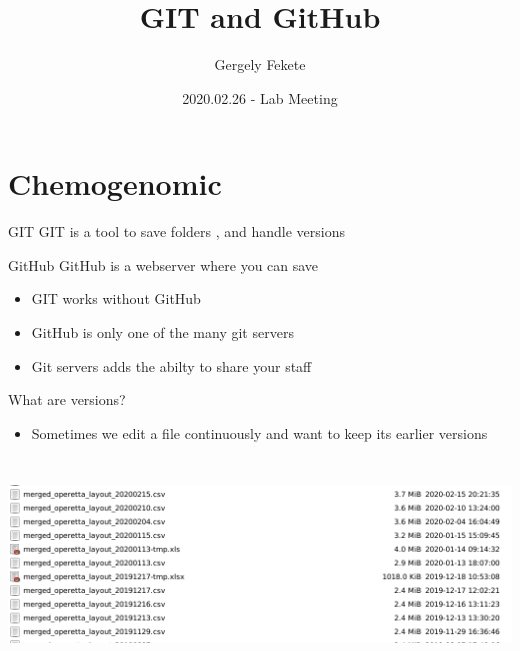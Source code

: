 \documentclass{beamer}
\title{GIT and GitHub}
\author{Gergely Fekete}
\date{2020.02.26 -  Lab Meeting}
\begin{document}
\begin{frame}
\titlepage
\end{frame}

\section{Chemogenomic}




\begin{frame}

\begin{block}{GIT}
GIT is a  tool to save folders , and handle versions
\end{block}


\begin{block}{GitHub}
GitHub is a webserver where you can save 
\end{block}



\begin{itemize}
\item GIT works without GitHub
\item GitHub is only one of the many git servers
\item Git servers adds the abilty to share your staff
\end{itemize}
 
\end{frame}



\begin{frame}

What are versions? 


\begin{itemize}
\item Sometimes we edit a file continuously and want to keep its earlier versions
\end{itemize}
\includegraphics[height=160pt]{pictures/Screenshot_2020-02-25_17-47-03-ugly_folder-zoom_in.png}

\end{frame}
\end{document}
